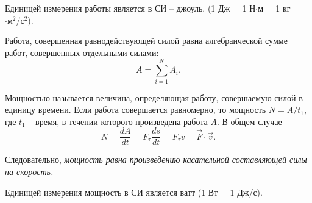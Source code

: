 Единицей измерения работы является в СИ -- джоуль.
(1 Дж = 1 Н\( \cdot \)м = 1 кг\( \cdot\text{м}^2/\text{с}^2 \)).

Работа, совершенная равнодействующей силой равна алгебраической сумме 
работ, совершенных отдельными силами:
\[
    A = \sum_{i=1}^{N} A_i.
\]

Мощностью называется величина, определяющая работу, совершаемую силой 
в единицу времени. Если работа совершается равномерно, то мощность 
\( N = A/t_1 \), где \( t_1 \) -- время, в течении которого произведена 
работа \( A \). В общем случае
\[
    N = \frac{dA}{dt} = F_\tau \frac{ds}{dt} = F_\tau v = \vec{F}\cdot\vec{v}.
\]

Следовательно, \emph{мощность равна произведению касательной 
составляющей силы на скорость.}

Единицей измерения мощность в СИ является ватт (1 Вт = 1 Дж/с).

\newpage
